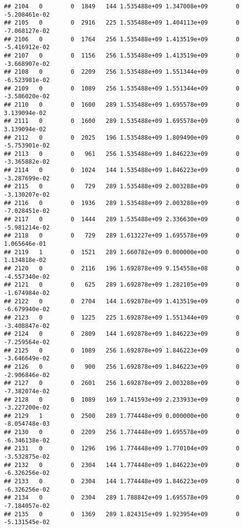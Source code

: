\documentclass[
]{article}
\begin{document}
\begin{enumerate}
\begin{verbatim}
## 2104   0        0  1849   144 1.535488e+09 1.347008e+09        0 -5.208461e-02
## 2105   0        0  2916   225 1.535488e+09 1.404113e+09        0 -7.068127e-02
## 2106   0        0  1764   256 1.535488e+09 1.413519e+09        0 -5.416912e-02
## 2107   0        0  1156   256 1.535488e+09 1.413519e+09        0 -3.668907e-02
## 2108   0        0  2209   256 1.535488e+09 1.551344e+09        0 -6.523981e-02
## 2109   0        0  1089   256 1.535488e+09 1.551344e+09        0 -3.586020e-02
## 2110   0        0  1600   289 1.535488e+09 1.695578e+09        0  3.139094e-02
## 2111   0        0  1600   289 1.535488e+09 1.695578e+09        0  3.139094e-02
## 2112   0        0  2025   196 1.535488e+09 1.809490e+09        0 -5.753901e-02
## 2113   0        0   961   256 1.535488e+09 1.846223e+09        0 -3.365882e-02
## 2114   0        0  1024   144 1.535488e+09 1.846223e+09        0 -3.287699e-02
## 2115   0        0   729   289 1.535488e+09 2.003288e+09        0 -3.130207e-02
## 2116   0        0  1936   289 1.535488e+09 2.003288e+09        0 -7.028451e-02
## 2117   0        0  1444   289 1.535488e+09 2.336630e+09        0 -5.981214e-02
## 2118   0        0   729   289 1.613227e+09 1.695578e+09        0  1.065646e-01
## 2119   1        0  1521   289 1.660782e+09 0.000000e+00        0  1.134818e-02
## 2120   0        0  2116   196 1.692878e+09 9.154558e+08        0 -4.557340e-02
## 2121   0        0   625   289 1.692878e+09 1.282105e+09        0 -1.674984e-02
## 2122   0        0  2704   144 1.692878e+09 1.413519e+09        0 -6.679940e-02
## 2123   0        0  1225   225 1.692878e+09 1.551344e+09        0 -3.408847e-02
## 2124   0        0  2809   144 1.692878e+09 1.846223e+09        0 -7.259564e-02
## 2125   0        0  1089   256 1.692878e+09 1.846223e+09        0 -3.646649e-02
## 2126   0        0   900   256 1.692878e+09 1.846223e+09        0 -2.906846e-02
## 2127   0        0  2601   256 1.692878e+09 2.003288e+09        0 -7.382074e-02
## 2128   0        0  1089   169 1.741593e+09 2.233933e+09        0 -3.227200e-02
## 2129   1        0  2500   289 1.774448e+09 0.000000e+00        0 -8.054748e-03
## 2130   0        0  2209   256 1.774448e+09 1.695578e+09        0 -6.346138e-02
## 2131   0        0  1296   196 1.774448e+09 1.770104e+09        0 -3.532875e-02
## 2132   0        0  2304   144 1.774448e+09 1.846223e+09        0 -6.326256e-02
## 2133   0        0  2304   144 1.774448e+09 1.846223e+09        0 -6.326256e-02
## 2134   0        0  2304   289 1.788842e+09 1.695578e+09        0 -7.184057e-02
## 2135   0        0  1369   289 1.824315e+09 1.923954e+09        0 -5.131545e-02

\end{verbatim}
\end{enumerate}
\end{document}
